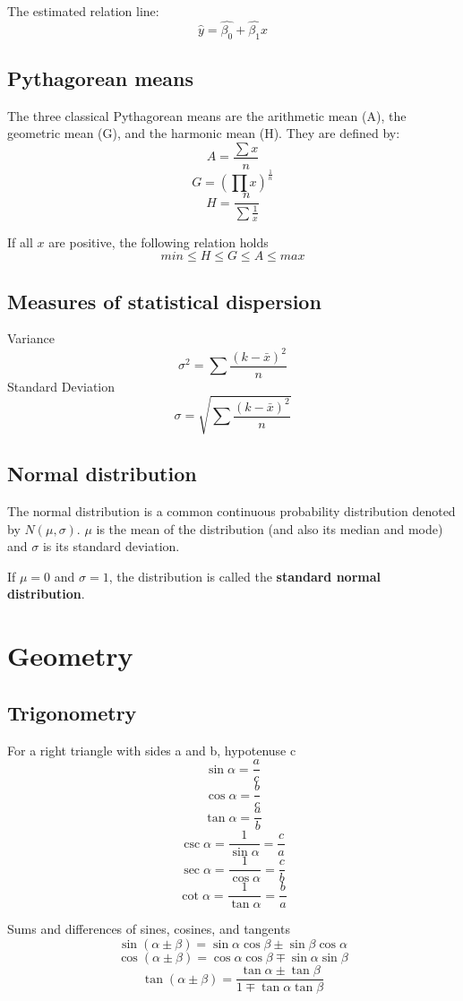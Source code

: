 \documentclass[oneside]{book} %
\theoremstyle{plain}
\newcommand*\mean[1]{\bar{#1}}
\newcommand*\reciprocal[1]{\frac{1}{#1}}
\begin{document}
The estimated relation line:
\[\hat y = \hat {\beta_0} + \hat {\beta_1} x\]

\section{Pythagorean means}
The three classical Pythagorean means are the arithmetic mean (A), the
geometric mean (G), and the harmonic mean (H). They are defined by:
\[A = \frac{\sum{x}}{n}\]
\[G = \left( \prod{x} \right) ^ \reciprocal{n}\]
\[H = \frac{n}{\sum{\reciprocal{x}}}\]

If all \(x\) are positive, the following relation holds
\[min \le H \le G \le A \le max\]

\section{Measures of statistical dispersion}
Variance
\[\sigma^2 = \sum \frac{\left ( k-\mean{x} \right ) ^ 2}{n}\]
Standard Deviation
\[\sigma = \sqrt{\sum \frac{\left ( k-\mean{x} \right ) ^ 2}{n}}\]

\section{Normal distribution}
The normal distribution is a common continuous probability distribution denoted
by \(N(\mu, \sigma)\). \(\mu\) is the mean of the distribution (and also its
median and mode) and \(\sigma\) is its standard deviation.

If \(\mu = 0\) and \(\sigma = 1\), the distribution is called the
\textbf{standard normal distribution}.

\chapter{Geometry}

\section{Trigonometry}

For a right triangle with sides a and b, hypotenuse c
\[\sin{\alpha} = \frac{a}{c}\]
\[\cos{\alpha} = \frac{b}{c}\]
\[\tan{\alpha} = \frac{a}{b}\]
\[\csc{\alpha} = \reciprocal{\sin{\alpha}} = \frac{c}{a}\]
\[\sec{\alpha} = \reciprocal{\cos{\alpha}} = \frac{c}{b}\]
\[\cot{\alpha} = \reciprocal{\tan{\alpha}} = \frac{b}{a}\]

Sums and differences of sines, cosines, and tangents
\[{\sin{\left( \alpha \pm \beta \right)} =
  \sin{\alpha}\cos{\beta} \pm \sin{\beta}\cos{\alpha}}\]
\[{\cos{\left( \alpha \pm \beta \right)} =
  \cos{\alpha}\cos{\beta} \mp \sin{\alpha}\sin{\beta}}\]
\[{\tan{\left( \alpha \pm \beta \right)} =
  \frac{\tan{\alpha} \pm \tan{\beta}}{1 \mp \tan{\alpha} \tan{\beta}}}\]
\end{document}
